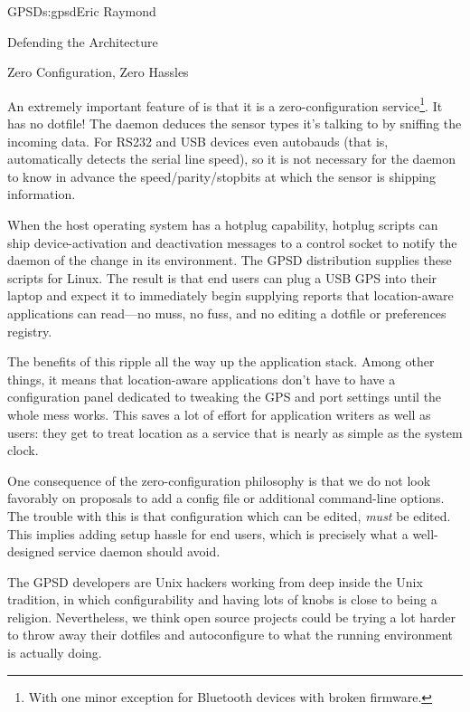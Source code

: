 \begin{aosachapter}{GPSD}{s:gpsd}{Eric Raymond}
\begin{aosasect1}{Defending the Architecture}
\end{aosasect1}

\begin{aosasect1}{Zero Configuration, Zero Hassles}

An extremely important feature of  is that it is a
zero-configuration service\footnote{With one minor exception for
Bluetooth devices with broken firmware.}.  It has no dotfile!  The
daemon deduces the sensor types it's talking to by sniffing the
incoming data.  For RS232 and USB devices  even autobauds
(that is, automatically detects the serial line speed), so it is not
necessary for the daemon to know in advance the speed/parity/stopbits
at which the sensor is shipping information.

When the host operating system has a hotplug capability, hotplug
scripts can ship device-activation and deactivation messages to a
control socket to notify the daemon of the change in its environment.
The GPSD distribution supplies these scripts for Linux.  The result
is that end users can plug a USB GPS into their laptop and expect
it to immediately begin supplying reports that location-aware
applications can read---no muss, no fuss, and no editing a 
dotfile or preferences registry.

The benefits of this ripple all the way up the application stack.
Among other things, it means that location-aware applications don't
have to have a configuration panel dedicated to tweaking the GPS and
port settings until the whole mess works. This saves a lot of effort
for application writers as well as users: they get to treat location
as a service that is nearly as simple as the system clock.

One consequence of the zero-configuration philosophy is that we do not
look favorably on proposals to add a config file or additional
command-line options.  The trouble with this is that configuration
which can be edited, \emph{must} be edited.  This implies adding setup
hassle for end users, which is precisely what a well-designed service
daemon should avoid.

The GPSD developers are Unix hackers working from deep inside the
Unix tradition, in which configurability and having lots of knobs
is close to being a religion.  Nevertheless, we think open source
projects could be trying a lot harder to throw away their dotfiles
and autoconfigure to what the running environment is actually doing.

\end{aosasect1}


\end{aosachapter}
